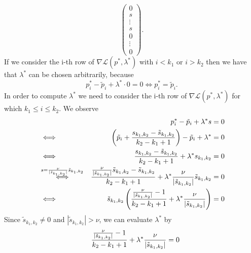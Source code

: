 \documentclass[abstracton]{scrreprt}
\newenvironment{proof}[1][Proof]{\begin{trivlist}
\item[\hskip \labelsep {\bfseries #1}]}{\end{trivlist}}
\begin{document}
\begin{proof}
$$\begin{pmatrix}
                            0 \\
                            s \\
                            \vdots \\
                            s \\
                            0 \\
                            \vdots \\
                            0
                        \end{pmatrix}.
                $$
                If we consider the i-th row of $\nabla \mathcal{L}(p^{\ast}, \lambda^{\ast})$ with $i < k_{1}$ or $i > k_{2}$ then we have that $\lambda^{\ast}$ can be chosen arbitrarily, because
                    $$
                        p^{\ast}_{i} - \tilde{p}_{i} + \lambda^{\ast} \cdot 0 = 0 \iff  p^{\ast}_{i} = \tilde{p}_{i}.
                    $$
                In order to compute $\lambda^{\ast}$ we need to consider the i-th row of $\nabla \mathcal{L}(p^{\ast}, \lambda^{\ast})$ for which $k_{1} \le i \le k_{2}$. We observe
                    \begin{eqnarray}
                        &&p^{\ast}_{i} - \tilde{p}_{i} + \lambda^{\ast} s = 0 \notag \\
                        &\iff& \left(\tilde{p}_{i} + \frac{s_{k_{1}, k_{2}} - \tilde{s}_{k_{1}, k_{2}}}{k_{2} - k_{1} + 1}\right) - \tilde{p}_{i} + \lambda^{\ast}  = 0 \notag \\
                        &\iff& \frac{s_{k_{1}, k_{2}} - \tilde{s}_{k_{1}, k_{2}}}{k_{2} - k_{1} + 1} + \lambda^{\ast}s_{k_{1}, k_{2}} = 0 \notag \\
                        &\overset{s = \frac{\nu}{|\tilde{s}_{k_{1}, k_{2}}|}\tilde{s}_{k_{1}, k_{2}}}{\iff}& \frac{\frac{\nu}{|\tilde{s}_{k_{1}, k_{2}}|} \tilde{s}_{k_{1}, k_{2}} - \tilde{s}_{k_{1}, k_{2}}}{k_{2} - k_{1} + 1} + \lambda^{\ast}\frac{\nu}{|\tilde{s}_{k_{1}, k_{2}}|} \tilde{s}_{k_{1}, k_{2}} = 0 \notag \\
                        &\iff& \tilde{s}_{k_{1}, k_{2}} \left( \frac{\frac{\nu}{|\tilde{s}_{k_{1}, k_{2}}|} - 1}{k_{2} - k_{1} + 1} + \lambda^{\ast}\frac{\nu}{|\tilde{s}_{k_{1}, k_{2}}|} \right) = 0 \notag
                    \end{eqnarray}
                Since $\tilde{s}_{k_{1}, k_{2}} \neq 0$ and $|\tilde{s}_{k_{1}, k_{2}}| > \nu$, we can evaluate $\lambda^{\ast}$ by
                    \begin{eqnarray}
                        && \frac{\frac{\nu}{|\tilde{s}_{k_{1}, k_{2}}|} - 1}{k_{2} - k_{1} + 1} + \lambda^{\ast}\frac{\nu}{|\tilde{s}_{k_{1}, k_{2}}|} = 0 \notag \\

\end{eqnarray}
\end{proof}
\end{document}
